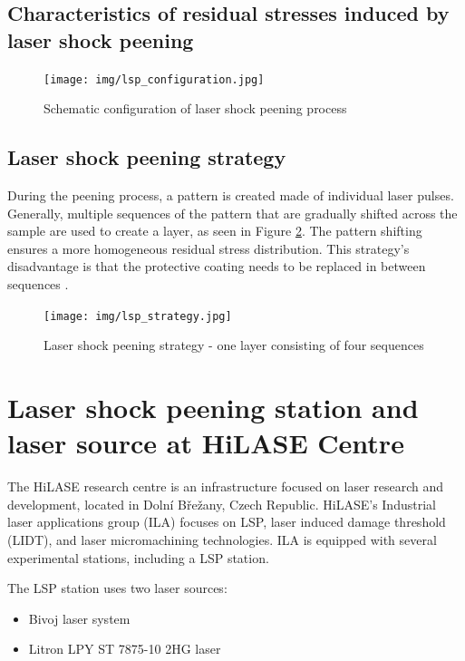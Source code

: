 \subsection{Characteristics of residual stresses induced by laser shock peening}



\begin{figure}[h]
    \centering
    \texttt{[image: img/lsp\_configuration.jpg]}
    \caption{Schematic configuration of laser shock peening process}
    \label{fig:lspconfiguration}
\end{figure}

\subsection{Laser shock peening strategy}
During the peening process, a pattern is created made of individual laser pulses. Generally, multiple sequences of the pattern that are gradually shifted across the sample are used to create a layer, as seen in Figure \ref{fig:lspstrategy}. The pattern shifting ensures a more homogeneous residual stress distribution. This strategy's disadvantage is that the protective coating needs to be replaced in between sequences \cite{kaufman}.

\begin{figure}[h]
    \centering
    \texttt{[image: img/lsp\_strategy.jpg]}
    \caption{Laser shock peening strategy - one layer consisting of four sequences}
    \label{fig:lspstrategy}
\end{figure}

\section{Laser shock peening station and laser source at HiLASE Centre}

The HiLASE research centre is an infrastructure focused on laser research and development, located in Dolní Břežany, Czech Republic. HiLASE's Industrial laser applications group (ILA) focuses on LSP, laser induced damage threshold (LIDT), and laser micromachining technologies. ILA is equipped with several experimental stations, including a LSP station. 

The LSP station uses two laser sources:

\begin{itemize}
  \item Bivoj laser system
  \item Litron LPY ST 7875-10 2HG laser 
\end{itemize}

